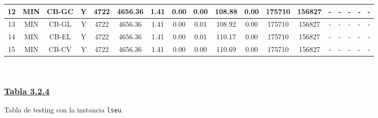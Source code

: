 {\begin{tabular}{ *{17}{c|} c }
\hline
12 & MIN & CB-GC & Y & 4722 & 4656.36 & 1.41 & 0.00 & 0.00 & 108.88 & 0.00 & 175710 & 156827 & - & - & - & - & -\\
\hline
13 & MIN & CB-GL & Y & 4722 & 4656.36 & 1.41 & 0.00 & 0.01 & 108.92 & 0.00 & 175710 & 156827 & - & - & - & - & -\\
\hline
14 & MIN & CB-EL & Y & 4722 & 4656.36 & 1.41 & 0.00 & 0.01 & 110.17 & 0.00 & 175710 & 156827 & - & - & - & - & -\\
\hline
15 & MIN & CB-CV & Y & 4722 & 4656.36 & 1.41 & 0.00 & 0.00 & 110.69 & 0.00 & 175710 & 156827 & - & - & - & - & -\\
\hline
\end{tabular}\\
\vspace{4mm}
}

\newpage

\subsubsection*{\underline{Tabla 3.2.4}}
\noindent Tabla de testing con la instancia \verb_lseu_.\\

